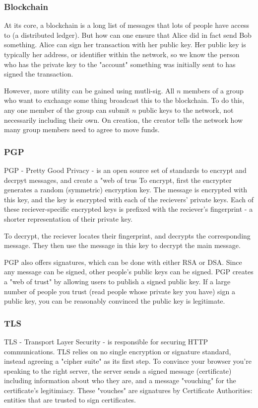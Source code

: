 \documentclass{article}
\begin{document}
\subsubsection{Blockchain}
At its core, a blockchain is a long list of messages that lots of people have access to (a distributed ledger).
But how can one ensure that Alice did in fact send Bob something.
Alice can sign her transaction with her public key.
Her public key is typically her address, or identifier within the network,
so we know the person who has the private key to the "account"
something was initially sent to has signed the transaction.

However, more utility can be gained using mutli-sig.
All $n$ members of a group who want to exchange some thing broadcast this to the blockchain.
To do this, any one member of the group can submit $n$ public keys to the network, not necessarily including their own.
On creation, the creator tells the network how many group members need to agree to move funds.

\subsubsection{PGP}
PGP - Pretty Good Privacy - is an open source set of standards to
encrypt and decrpyt messages, and create a "web of trus
To encrypt, first the encrypter generates a random (symmetric) encryption key.
The message is encrypted with this key,
and the key is encrypted with each of the recievers' private keys.
Each of these reciever-specific encrypted keys is prefixed with the
reciever's fingerprint - a shorter representation of their private key.

To decrypt, the reciever locates their fingerprint, and decrypts the corresponding message.
They then use the message in this key to decrypt the main message.

PGP also offers signatures, which can be done with either RSA or DSA.
Since any message can be signed, other people's public keys can be signed.
PGP creates a "web of trust" by allowing users to publish a signed public key.
If a large number of people you trust (read people whose private key you have)
sign a public key, you can be reasonably convinced the public key is legitimate.
\subsubsection{TLS}
TLS - Transport Layer Security - is responsible for securing HTTP communications.
TLS relies on no single encryption or signature standard, instead agreeing a "cipher suite" as its first step.
To convince your browser you're speaking to the right server,
the server sends a signed message (certificate) including information about who they are,
and a message "vouching" for the certificate's legitimiacy.
These "vouches" are signatures by Certificate Authorities: entities that are trusted to sign certificates.
\end{document}
